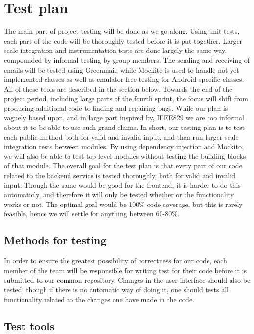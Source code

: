 \chapter{Test plan}

The main part of project testing will be done as we go along. Using unit tests, each part of the code will be thoroughly tested before it is put together. Larger scale integration and instrumentation tests are done largely the same way, compounded by informal testing by group members. The sending and receiving of emails will be tested using Greenmail, while Mockito is used to handle not yet implemented classes as well as emulator free testing for Android specific classes. All of these tools are described in the section below. Towards the end of the project period, including large parts of the fourth sprint, the focus will shift from producing additional code to finding and repairing bugs. While our plan is vaguely based upon, and in large part inspired by, IEEE829 \cite{bib:ieee} we are too informal about it to be able to use such grand claims. In short, our testing plan is to test each public method both for valid and invalid input, and then run larger scale integration tests between modules.
By using dependency injection and Mockito, we will also be able to test top level modules without testing the building blocks of that module. 
\newline
\newline
The overall goal for the test plan is that every part of our code related to the backend service is tested thoroughly, both for valid and invalid input. Though the same would be good for the frontend,
it is harder to do this automaticly, and therefore it will only be tested whether or the functionality works or not. The optimal goal would be 100\% code coverage, but this is rarely feasible, hence
we will settle for anything between 60-80\%. 

\section{Methods for testing}
In order to ensure the greatest possibility of correctness for our code, each member of the team will be responsible for writing test for their code before it is submitted to our common repository.
Changes in the user interface should also be tested, though if there is no automatic way of doing it, one should tests all functionality related to the changes one have made in the code. 

\section{Test tools}
